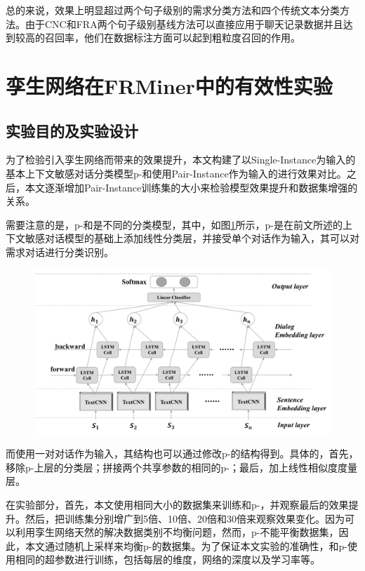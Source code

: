 总的来说，{\tool}效果上明显超过两个句子级别的需求分类方法和四个传统文本分类方法。由于CNC和FRA两个句子级别基线方法可以直接应用于聊天记录数据并且达到较高的召回率，他们在数据标注方面可以起到粗粒度召回的作用。

\section{孪生网络在FRMiner中的有效性实验}
\subsection{实验目的及实验设计}
为了检验引入孪生网络而带来的效果提升，本文构建了以Single-Instance为输入的基本上下文敏感对话分类模型p-{\tool}和使用Pair-Instance作为输入的{\tool}进行效果对比。之后，本文逐渐增加Pair-Instance训练集的大小来检验模型效果提升和数据集增强的关系。


需要注意的是，p-{\tool}和{\tool}是不同的分类模型，其中，如图\ref{fig:model-cls}所示，p-{\tool}是在前文所述的上下文敏感对话模型{\dm}的基础上添加线性分类层，并接受单个对话作为输入，其可以对需求对话进行分类识别。
\begin{figure}[htbp]
    \centering
    \includegraphics[width=\textwidth]{Img/model_cls.pdf}
    \label{fig:model-cls}
\end{figure}

而{\tool}使用一对对话作为输入，其结构也可以通过修改p-{\tool}的结构得到。具体的，首先，移除p-{\tool}上层的分类层；拼接两个共享参数的相同的p-{\tool}；最后，加上线性相似度度量层。

在实验部分，首先，本文使用相同大小的数据集来训练{\tool}和p-{\tool}，并观察最后的效果提升。然后，把训练集分别增广到5倍、10倍、20倍和30倍来观察效果变化。因为{\tool}可以利用孪生网络天然的解决数据类别不均衡问题，然而，p-{\tool}不能平衡数据集，因此，本文通过随机上采样来均衡p-{\tool}的数据集。为了保证本文实验的准确性，{\tool}和p-{\tool}使用相同的超参数进行训练，包括每层的维度，网络的深度以及学习率等。


